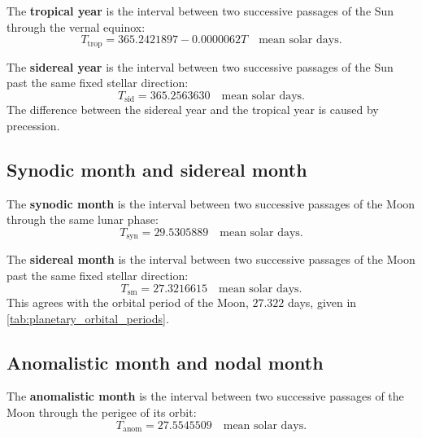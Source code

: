 \begin{definition}\label{def:tropical_year}
The \textbf{tropical year} is the interval between two successive passages of the Sun through the vernal equinox:
\[
T_{\text{trop}}=365.2421897-0.0000062T\quad\text{mean solar days}.
\]
\end{definition}

\begin{definition}\label{def:sidereal_year}
The \textbf{sidereal year} is the interval between two successive passages of the Sun past the same fixed stellar direction:
\[
T_{\text{sid}}=365.2563630\quad\text{mean solar days}.
\]
The difference between the sidereal year and the tropical year is caused by precession.
\end{definition}

\subsection{Synodic month and sidereal month}

\begin{definition}\label{def:synodic_month}
The \textbf{synodic month} is the interval between two successive passages of the Moon through the same lunar phase:
\[
T_{\text{syn}}=29.5305889\quad\text{mean solar days}.
\]
\end{definition}

\begin{definition}\label{def:sidereal_month}
The \textbf{sidereal month} is the interval between two successive passages of the Moon past the same fixed stellar direction:
\[
T_{\text{sm}}=27.3216615\quad\text{mean solar days}.
\]
This agrees with the orbital period of the Moon, $27.322$ days, given in \cref{tab:planetary_orbital_periods}.
\end{definition}

\subsection{Anomalistic month and nodal month}

\begin{definition}\label{def:anomalistic_month}
The \textbf{anomalistic month} is the interval between two successive passages of the Moon through the perigee of its orbit:
\[
T_{\text{anom}}=27.5545509\quad\text{mean solar days}.
\]
\end{definition}

